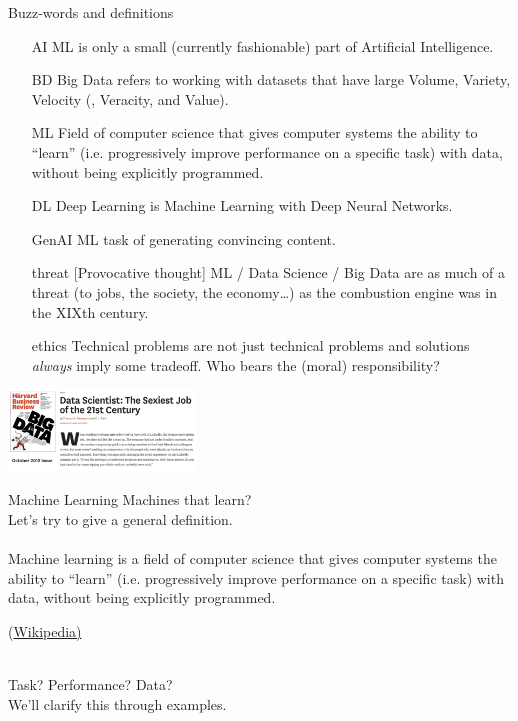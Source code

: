 \documentclass[10pt,a4paper,t,aspectratio=1610,dvipsnames]{beamer}
\begin{document}
\begin{frame}{Buzz-words and definitions}
	\begin{itemize}
		\item[AI] ML is only a small (currently fashionable) part of Artificial Intelligence.
		\item[BD] Big Data refers to working with datasets that have large Volume, Variety, Velocity (, Veracity, and Value).
		\item[ML] Field of computer science that gives computer systems the ability to ``learn'' (i.e. progressively improve performance on a specific task) with data, without being explicitly programmed.
		\item[DL] Deep Learning is Machine Learning with Deep Neural Networks.
		\item[GenAI] ML task of generating convincing content.
		\item[threat] [Provocative thought] ML / Data Science / Big Data are as much of a threat (to jobs, the society, the economy\ldots) as the combustion engine was in the XIXth century.
		\item[ethics] Technical problems are not just technical problems and solutions \emph{always} imply some tradeoff. Who bears the (moral) responsibility?
	\end{itemize}
	\begin{center}
		\includegraphics[width=5cm]{img/datascientist.png}
	\end{center}
\end{frame}

\begin{frame}{Machine Learning}
	\centering
	\vfill
	Machines that learn?\\
	Let's try to give a general definition.\\
	~\\Machine learning is a field of computer science that gives computer systems the ability to ``learn'' (i.e. progressively improve performance on a specific task) with data, without being explicitly programmed.
		\begin{flushright}
			{\footnotesize (\href{https://en.wikipedia.org/wiki/Machine_learning}{Wikipedia)}}
		\end{flushright}
	~\\
	Task? Performance? Data?\\
	We'll clarify this through examples.
\end{frame}
\end{document}

